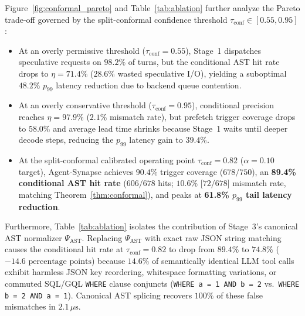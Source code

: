 \documentclass[10pt,conference]{IEEEtran}
\begin{document}
Figure~\ref{fig:conformal_pareto} and Table~\ref{tab:ablation} further analyze the Pareto trade-off governed by the split-conformal confidence threshold $\tau_{\text{conf}} \in [0.55, 0.95]$:
\begin{itemize}
    \item At an overly permissive threshold ($\tau_{\text{conf}} = 0.55$), Stage~1 dispatches speculative requests on $98.2\%$ of turns, but the conditional AST hit rate drops to $\eta = 71.4\%$ ($28.6\%$ wasted speculative I/O), yielding a suboptimal $48.2\%$ $p_{99}$ latency reduction due to backend queue contention.
    \item At an overly conservative threshold ($\tau_{\text{conf}} = 0.95$), conditional precision reaches $\eta = 97.9\%$ ($2.1\%$ mismatch rate), but prefetch trigger coverage drops to $58.0\%$ and average lead time shrinks because Stage~1 waits until deeper decode steps, reducing the $p_{99}$ latency gain to $39.4\%$.
    \item At the split-conformal calibrated operating point $\tau_{\text{conf}} = 0.82$ ($\alpha = 0.10$ target), Agent-Synapse achieves $90.4\%$ trigger coverage ($678/750$), an \textbf{89.4\% conditional AST hit rate} ($606/678$ hits; $10.6\%$ [$72/678$] mismatch rate, matching Theorem~\ref{thm:conformal}), and peaks at \textbf{61.8\% $p_{99}$ tail latency reduction}.
\end{itemize}

Furthermore, Table~\ref{tab:ablation} isolates the contribution of Stage~3's canonical AST normalizer $\Psi_{\text{AST}}$. Replacing $\Psi_{\text{AST}}$ with exact raw JSON string matching causes the conditional hit rate at $\tau_{\text{conf}} = 0.82$ to drop from $89.4\%$ to $74.8\%$ ($-14.6\text{ percentage points}$) because $14.6\%$ of semantically identical LLM tool calls exhibit harmless JSON key reordering, whitespace formatting variations, or commuted SQL/GQL \texttt{WHERE} clause conjuncts (\texttt{WHERE a = 1 AND b = 2} vs.\ \texttt{WHERE b = 2 AND a = 1}). Canonical AST splicing recovers $100\%$ of these false mismatches in $2.1\,\mu\text{s}$.
\end{document}
